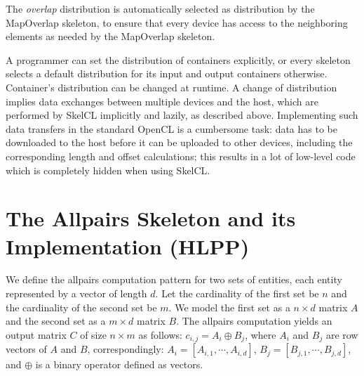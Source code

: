 The \emph{overlap} distribution is automatically selected as distribution by the MapOverlap skeleton, to ensure that every device has access to the neighboring elements as needed by the MapOverlap skeleton.

A programmer can set the distribution of containers explicitly, or every skeleton selects a default distribution for its input and output containers otherwise.
Container's distribution can be changed at runtime.
A change of distribution implies data exchanges between multiple devices and the host, which are performed by SkelCL implicitly and lazily, as described above.
Implementing such data transfers in the standard OpenCL is a cumbersome task:
data has to be downloaded to the host before it can be uploaded to other devices, including the corresponding length and offset calculations;
this results in a lot of low-level code which is completely hidden when using SkelCL.



\section{The Allpairs Skeleton and its Implementation (HLPP)}
\label{sec:allpairs_skeleton}

\label{sec:formal_def}
We define the allpairs computation pattern for two sets of entities, each entity represented by a vector of length $d$.
Let the cardinality of the first set be $n$ and the cardinality of the second set be $m$.
We model the first set as a $n\times d$ matrix $A$ and the second set as a $m\times d$ matrix $B$.
The allpairs computation yields an output matrix $C$ of size $n\times m$ as follows:
$c_{i, j} = A_i \oplus B_j$, where $A_i$ and $B_j$ are row vectors of $A$ and $B$, correspondingly:
$A_i = [A_{i,1}, \cdots, A_{i, d}]$, $B_j = [B_{j,1}, \cdots, B_{j,d}]$, and $\oplus$ is a binary operator defined as vectors.

